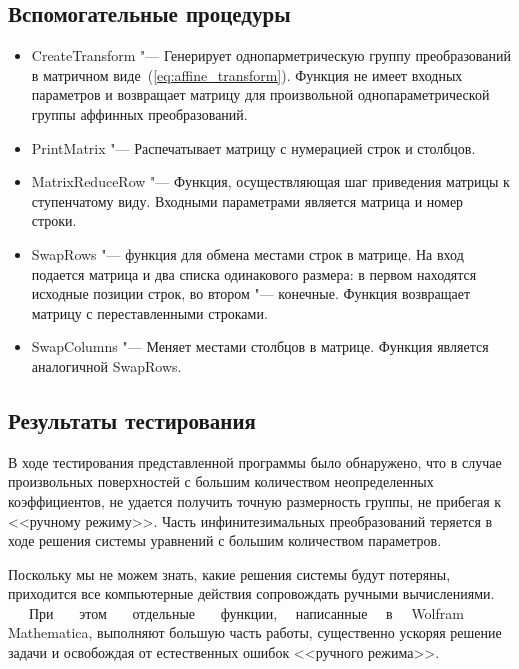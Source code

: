 \documentclass[../main.tex]{subfiles}
\begin{document}
\subsection{Вспомогательные процедуры}
\begin{itemize}
\item {\ttfamily CreateTransform} "--- Генерирует однопарметрическую группу преобразований в матричном виде~(\ref{eq:affine_transform}). Функция не имеет входных параметров и возвращает матрицу для произвольной однопараметрической группы аффинных преобразований.

\item {\ttfamily PrintMatrix} "--- Распечатывает матрицу с нумерацией строк и столбцов.

\item {\ttfamily MatrixReduceRow} "--- Функция, осуществляющая шаг приведения матрицы к ступенчатому виду. Входными параметрами является матрица и номер строки.

\item {\ttfamily SwapRows} "--- функция для обмена местами строк в матрице. На вход подается матрица и два списка одинакового размера: в первом находятся исходные позиции строк, во втором "--- конечные. Функция возвращает матрицу с переставленными строками.

\item {\ttfamily SwapColumns} "--- Меняет местами столбцов в матрице. Функция является аналогичной {\ttfamily SwapRows}.

\end{itemize}

\subsection{Результаты тестирования}
В ходе тестирования представленной программы было обнаружено, что в случае произвольных поверхностей с большим количеством неопределенных коэффициентов, не удается получить точную размерность группы, не прибегая к <<ручному режиму>>. Часть инфинитезимальных преобразований теряется в ходе решения системы уравнений с большим количеством параметров.

Поскольку мы не можем знать, какие решения системы будут потеряны, приходится все компьютерные действия сопровождать ручными вычислениями. ~~~При ~~~этом ~~~отдельные ~~~функции, ~~написанные ~~в ~~{\ttfamily Wolfram\\ Mathematica}, выполняют большую часть работы, существенно ускоряя решение задачи и освобождая от естественных ошибок <<ручного режима>>.
\end{document}

